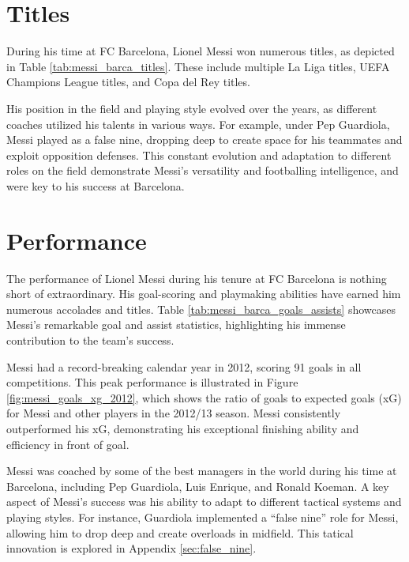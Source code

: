 \section{Titles}\label{sec:chap1_titles}

During his time at FC Barcelona, Lionel Messi won numerous titles, as depicted
in Table \ref{tab:messi_barca_titles}.
These include multiple La Liga titles, UEFA Champions League titles, and Copa del Rey
titles.



His position in the field and playing style evolved over the years, as 
different coaches utilized his talents in various ways.
For example, under Pep Guardiola, Messi played as a false nine, dropping deep
to create space for his teammates and exploit opposition defenses.
This constant evolution and adaptation to different roles on the field
demonstrate Messi's versatility and footballing intelligence, and were 
key to his success at Barcelona.



\section{Performance}\label{sec:chap1_performance}

The performance of Lionel Messi during his tenure at FC Barcelona is 
nothing short of extraordinary.
His goal-scoring and playmaking abilities have earned him numerous 
accolades and titles.
Table \ref{tab:messi_barca_goals_assists} showcases Messi's remarkable 
goal and assist statistics, highlighting his immense contribution to the 
team's success.

Messi had a record-breaking calendar year in 2012, scoring 91 goals in all competitions.
This peak performance is illustrated in Figure \ref{fig:messi_goals_xg_2012}, which
shows the ratio of goals to expected goals (xG) for Messi and other players
in the 2012/13 season.
Messi consistently outperformed his xG, demonstrating his exceptional finishing
ability and efficiency in front of goal.



Messi was coached by some of the best managers in the world during his time at
Barcelona, including Pep Guardiola, Luis Enrique, and Ronald Koeman.
A key aspect of Messi's success was his ability to adapt to different
tactical systems and playing styles.
For instance, Guardiola implemented a ``false nine'' role for Messi, allowing
him to drop deep and create overloads in midfield.
This tatical innovation is explored in Appendix \ref{sec:false_nine}.

